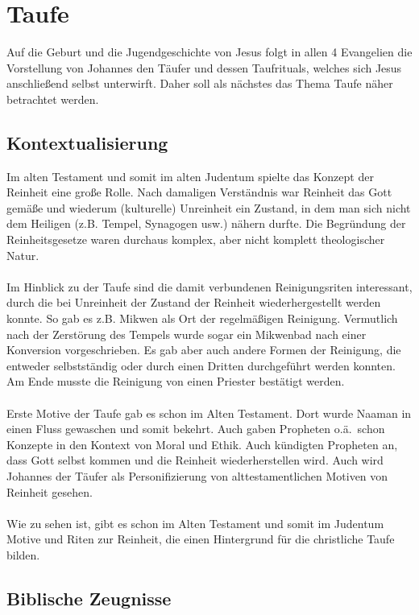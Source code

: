 \chapter{Taufe}
Auf die Geburt und die Jugendgeschichte von Jesus folgt in allen 4 Evangelien die Vorstellung von Johannes den Täufer und dessen Taufrituals, welches sich Jesus anschließend selbst unterwirft. Daher soll als nächstes das Thema Taufe näher betrachtet werden.

\section{Kontextualisierung}
Im alten Testament und somit im alten Judentum spielte das Konzept der Reinheit eine große Rolle. Nach damaligen Verständnis war Reinheit das Gott gemäße und wiederum (kulturelle) Unreinheit ein Zustand, in dem man sich nicht dem Heiligen (z.B. Tempel, Synagogen usw.) nähern durfte. Die Begründung der Reinheitsgesetze waren durchaus komplex, aber nicht komplett theologischer Natur.
\\~\\
Im Hinblick zu der Taufe sind die damit verbundenen Reinigungsriten interessant, durch die bei Unreinheit der Zustand der Reinheit wiederhergestellt werden konnte. So gab es z.B. Mikwen als Ort der regelmäßigen Reinigung. Vermutlich nach der Zerstörung des Tempels wurde sogar ein Mikwenbad nach einer Konversion vorgeschrieben. Es gab aber auch andere Formen der Reinigung, die entweder selbstständig oder durch einen Dritten durchgeführt werden konnten. Am Ende musste die Reinigung von einen Priester bestätigt werden.
\\~\\
Erste Motive der Taufe gab es schon im Alten Testament. Dort wurde Naaman in einen Fluss gewaschen und somit bekehrt. Auch gaben Propheten o.ä.\ schon Konzepte in den Kontext von Moral und Ethik. Auch kündigten Propheten an, dass Gott selbst kommen und die Reinheit wiederherstellen wird. Auch wird Johannes der Täufer als Personifizierung von alttestamentlichen Motiven von Reinheit gesehen.
\\~\\
Wie zu sehen ist, gibt es schon im Alten Testament und somit im Judentum Motive und Riten zur Reinheit, die einen Hintergrund für die christliche Taufe bilden.

\section{Biblische Zeugnisse}
